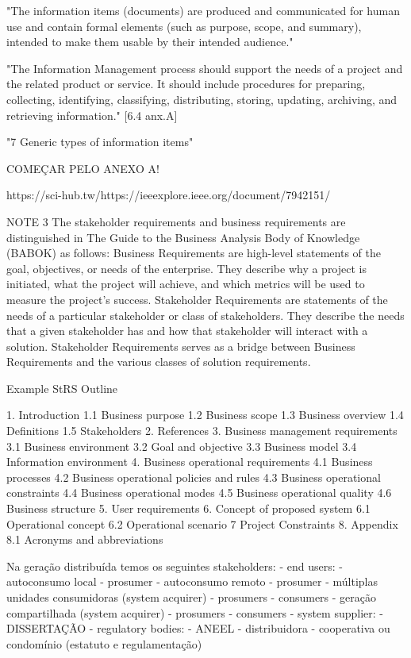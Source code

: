     "The	information	items	 (documents)	are	produced	and	communicated	for	human	use	and	contain	formal	elements	(such	as	purpose,	scope,	and	summary), intended	to	make	them	usable	by	their	intended audience."
    
    "The	 Information	 Management	 process	 should	support	 the	 needs	 of	 a	 project	 and	 the	 related	 product	 or	 service.	 It	 should	 include	 procedures	 for	 preparing,	collecting,	identifying,	classifying,	distributing,	storing,	updating,	archiving,	and	retrieving	information." [6.4 anx.A]
    
    "7 Generic types of information items"
    
    COMEÇAR PELO ANEXO A!
    
    https://sci-hub.tw/https://ieeexplore.ieee.org/document/7942151/
    

NOTE 3 The stakeholder requirements and business requirements are distinguished in The Guide to the Business
Analysis Body of Knowledge (BABOK) as follows: Business Requirements are high-level statements of the goal, objectives,
or needs of the enterprise. They describe why a project is initiated, what the project will achieve, and which metrics will be used to measure the project's success. Stakeholder Requirements are statements of the needs of a particular stakeholder
or class of stakeholders. They describe the needs that a given stakeholder has and how that stakeholder will interact with
a solution. Stakeholder Requirements serves as a bridge between Business Requirements and the various classes of
solution requirements.

Example StRS Outline

1. Introduction
  1.1 Business purpose
  1.2 Business scope
  1.3 Business overview
  1.4 Definitions
  1.5 Stakeholders
2. References
3. Business management requirements
  3.1 Business environment
  3.2 Goal and objective
  3.3 Business model
  3.4 Information environment
4. Business operational requirements
  4.1 Business processes
  4.2 Business operational policies and rules
  4.3 Business operational constraints
  4.4 Business operational modes
  4.5 Business operational quality
  4.6 Business structure
5. User requirements
6. Concept of proposed system
  6.1 Operational concept
  6.2 Operational scenario
7 Project Constraints
8. Appendix
  8.1 Acronyms and abbreviations


Na geração distribuída temos os seguintes stakeholders:
	- end users:
        - autoconsumo local
        	- prosumer
        - autoconsumo remoto
        	- prosumer
       	- múltiplas unidades consumidoras (system acquirer)
        	- prosumers
            - consumers
        - geração compartilhada (system acquirer)
        	- prosumers
            - consumers
    - system supplier:
    	- DISSERTAÇÃO
    - regulatory bodies:
    	- ANEEL
        - distribuidora
        - cooperativa ou condomínio (estatuto e regulamentação)



